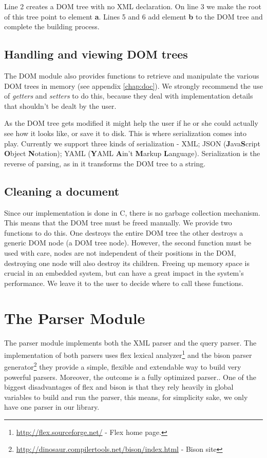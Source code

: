\documentclass[a4paper]{report}
\begin{document}
		Line 2 creates a DOM tree with no XML declaration. On line 3 we make the root of this tree point to element \textbf{a}. Lines 5 and 6 add element \textbf{b} to the DOM tree and complete the building process.

	\subsection{Handling and viewing DOM trees}
		The DOM module also provides functions to retrieve and manipulate the various DOM trees in memory (see appendix \ref{chap:doc}). We strongly recommend the use of \emph{getters} and \emph{setters} to do this, because they deal with implementation details that shouldn't be dealt by the user.

		As the DOM tree gets modified it might help the user if he or she could actually see how it looks like, or save it to disk. This is where serialization comes into play. Currently we support three kinds of serialization - XML;
		JSON (\textbf{J}ava\textbf{S}cript \textbf{O}bject \textbf{N}otation); YAML (\textbf{Y}AML \textbf{A}in't \textbf{M}arkup \textbf{L}anguage). Serialization is the reverse of parsing, as in it transforms the DOM tree to a string.

	\subsection{Cleaning a document}
		Since our implementation is done in C, there is no garbage collection mechanism. This means that the DOM tree must be freed manually. We provide two functions to do this. One destroys the entire DOM tree the other destroys a generic DOM node (a DOM tree node). However, the second function must be used with care, nodes are not independent of their positions in the DOM, destroying one node will also destroy its children. Freeing up memory space is crucial in an embedded system, but can have a great impact in the system's performance. We leave it to the user to decide where to call these functions.

\section{The Parser Module}\label{sec:parser}
	The parser module implements both the XML parser and the query parser. The implementation of both parsers uses flex lexical analyzer\footnote{\url{http://flex.sourceforge.net/} - Flex home page.} and the bison parser generator\footnote{\url{http://dinosaur.compilertools.net/bison/index.html} - Bison site} they provide a simple, flexible and extendable way to build very powerful parsers. Moreover, the outcome is a fully optimized parser.. One of the biggest disadvantages of flex and bison is that they rely heavily in global variables to build and run the parser, this means, for simplicity sake, we only have one parser in our library.
\end{document}
